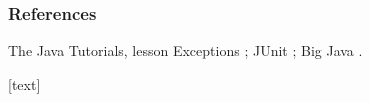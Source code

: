 \documentclass[aspectratio=169,10pt,compress]{beamer}
\begin{document}
\begin{frame}[t,fragile] \frametitle{References}
	\small The Java Tutorials, lesson Exceptions \cite{TheJavaTutorials}; JUnit \cite{homeJunit}; Big Java \cite{horstmann2016big}.

	\vspace{1em}
	[text]
	
	\tiny
\end{frame}




\begin{frame}[t,fragile]
	\begin{center}
		\vspace{4cm}
	\end{center}
\end{frame}
\end{document}
